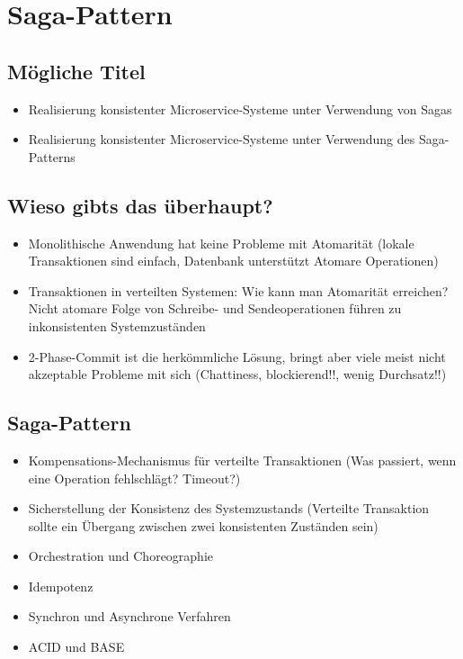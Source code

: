 \chapter{Saga-Pattern}

\section{Mögliche Titel}
\begin{itemize}
	\item Realisierung konsistenter Microservice-Systeme unter Verwendung von Sagas
	\item Realisierung konsistenter Microservice-Systeme unter Verwendung des Saga-Patterns
\end{itemize}

\section{Wieso gibts das überhaupt?}
\begin{itemize}
	\item Monolithische Anwendung hat keine Probleme mit Atomarität (lokale Transaktionen sind einfach, Datenbank unterstützt Atomare Operationen)
	\item Transaktionen in verteilten Systemen: Wie kann man Atomarität erreichen? Nicht atomare Folge von Schreibe- und Sendeoperationen führen zu inkonsistenten Systemzuständen
	\item 2-Phase-Commit ist die herkömmliche Lösung, bringt aber viele meist nicht akzeptable Probleme mit sich (Chattiness, blockierend!!, wenig Durchsatz!!)
\end{itemize}

\section{Saga-Pattern} \label{Saga-Pattern-Theorie}
\begin{itemize}
	\item Kompensations-Mechanismus für verteilte Transaktionen (Was passiert, wenn eine Operation fehlschlägt? Timeout?)
	\item Sicherstellung der Konsistenz des Systemzustands (Verteilte Transaktion sollte ein Übergang zwischen zwei konsistenten Zuständen sein)
	\item Orchestration und Choreographie
	\item Idempotenz
	\item Synchron und Asynchrone Verfahren
	\item ACID und BASE
\end{itemize}

